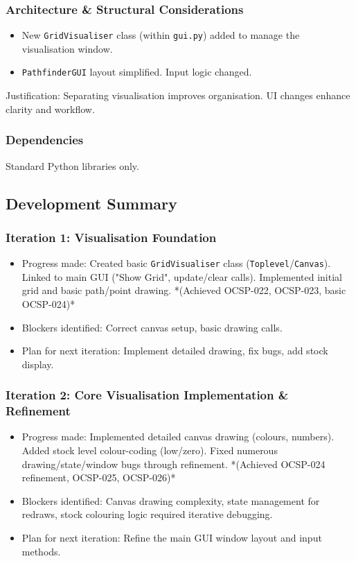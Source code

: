 \subsubsection{Architecture \& Structural Considerations}
\begin{itemize}
	\item New \verb|GridVisualiser| class (within \verb|gui.py|) added to manage the visualisation window.
	\item \verb|PathfinderGUI| layout simplified. Input logic changed.
\end{itemize}
Justification: Separating visualisation improves organisation. UI changes enhance clarity and workflow.

\subsubsection{Dependencies}
Standard Python libraries only.

\newpage
\subsection{Development Summary}

\subsubsection{Iteration 1: Visualisation Foundation}
\begin{itemize}
	\item Progress made: Created basic \verb|GridVisualiser| class (\verb|Toplevel|/\verb|Canvas|). Linked to main GUI ("Show Grid", update/clear calls). Implemented initial grid and basic path/point drawing. *(Achieved OCSP-022, OCSP-023, basic OCSP-024)*
	\item Blockers identified: Correct canvas setup, basic drawing calls.
	\item Plan for next iteration: Implement detailed drawing, fix bugs, add stock display.
\end{itemize}

\subsubsection{Iteration 2: Core Visualisation Implementation \& Refinement}
\begin{itemize}
	\item Progress made: Implemented detailed canvas drawing (colours, numbers). Added stock level colour-coding (low/zero). Fixed numerous drawing/state/window bugs through refinement. *(Achieved OCSP-024 refinement, OCSP-025, OCSP-026)*
	\item Blockers identified: Canvas drawing complexity, state management for redraws, stock colouring logic required iterative debugging.
	\item Plan for next iteration: Refine the main GUI window layout and input methods.
\end{itemize}

